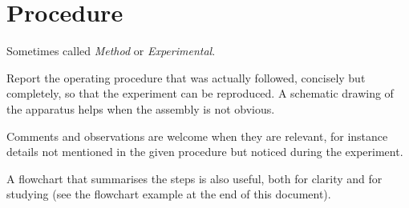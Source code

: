\section{Procedure}
Sometimes called \emph{Method} or \emph{Experimental}.

Report the operating procedure that was actually followed, concisely but completely, so that the experiment can be reproduced. A schematic drawing of the apparatus helps when the assembly is not obvious.

Comments and observations are welcome when they are relevant, for instance details not mentioned in the given procedure but noticed during the experiment.


A flowchart that summarises the steps is also useful, both for clarity and for studying (see the flowchart example at the end of this document).
